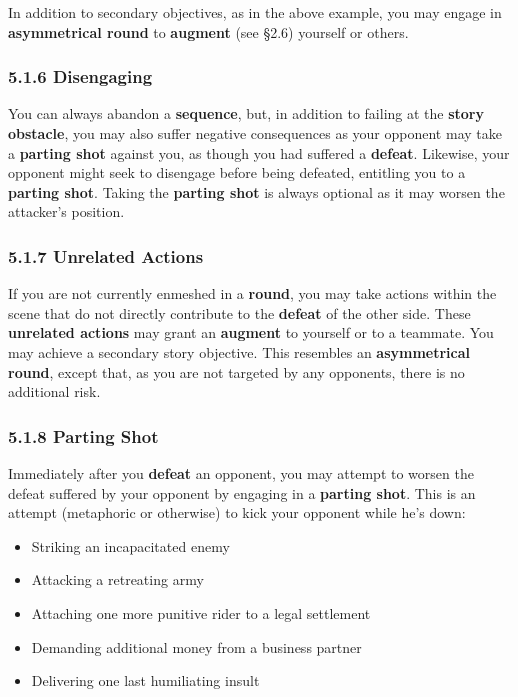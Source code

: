 \documentclass[
  11pt,
]{article}
\providecommand{\tightlist}{%
  \setlength{\itemsep}{0pt}\setlength{\parskip}{0pt}}
\begin{document}
In addition to secondary objectives, as in the above example, you may
engage in \textbf{asymmetrical round} to \textbf{augment} (see §2.6)
yourself or others.

\hypertarget{disengaging}{%
\subsubsection{5.1.6 Disengaging}\label{disengaging}}

You can always abandon a \textbf{sequence}, but, in addition to failing
at the \textbf{story obstacle}, you may also suffer negative
consequences as your opponent may take a \textbf{parting shot} against
you, as though you had suffered a \textbf{defeat}. Likewise, your
opponent might seek to disengage before being defeated, entitling you to
a \textbf{parting shot}. Taking the \textbf{parting shot} is always
optional as it may worsen the attacker's position.

\hypertarget{unrelated-actions}{%
\subsubsection{5.1.7 Unrelated Actions}\label{unrelated-actions}}

If you are not currently enmeshed in a \textbf{round}, you may take
actions within the scene that do not directly contribute to the
\textbf{defeat} of the other side. These \textbf{unrelated actions} may
grant an \textbf{augment} to yourself or to a teammate. You may achieve
a secondary story objective. This resembles an \textbf{asymmetrical
round}, except that, as you are not targeted by any opponents, there is
no additional risk.

\hypertarget{parting-shot}{%
\subsubsection{5.1.8 Parting Shot}\label{parting-shot}}

Immediately after you \textbf{defeat} an opponent, you may attempt to
worsen the defeat suffered by your opponent by engaging in a
\textbf{parting shot}. This is an attempt (metaphoric or otherwise) to
kick your opponent while he's down:

\begin{itemize}
\tightlist
\item
  Striking an incapacitated enemy
\item
  Attacking a retreating army
\item
  Attaching one more punitive rider to a legal settlement
\item
  Demanding additional money from a business partner
\item
  Delivering one last humiliating insult
\end{itemize}
\end{document}
